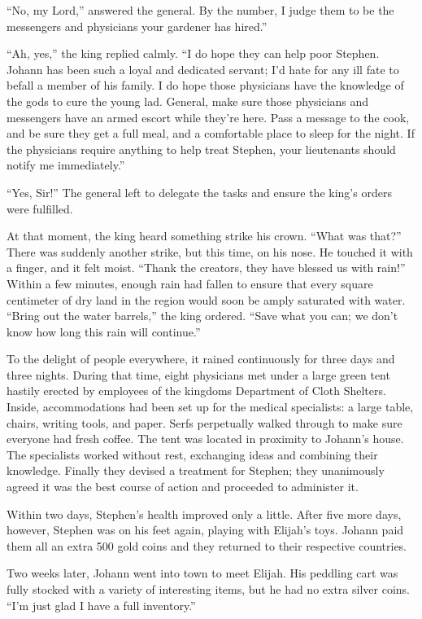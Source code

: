 “No, my Lord,” answered the general. By the number, I judge them to be the messengers and physicians your gardener has hired.”

“Ah, yes,” the king replied calmly. “I do hope they can help poor Stephen. Johann has been such a loyal and dedicated servant; I'd hate for any ill fate to befall a member of his family. I do hope those physicians have the knowledge of the gods to cure the young lad. General, make sure those physicians and messengers have an armed escort while they're here. Pass a message to the cook, and be sure they get a full meal, and a comfortable place to sleep for the night. If the physicians require anything to help treat Stephen, your lieutenants should notify me immediately.”

“Yes, Sir!” The general left to delegate the tasks and ensure the king's orders were fulfilled.

At that moment, the king heard something strike his crown. “What was that?” There was suddenly another strike, but this time, on his nose. He touched it with a finger, and it felt moist. “Thank the creators, they have blessed us with rain!” Within a few minutes, enough rain had fallen to ensure that every square centimeter of dry land in the region would soon be amply saturated with water. “Bring out the water barrels,” the king ordered. “Save what you can; we don't know how long this rain will continue.”

To the delight of people everywhere, it rained continuously for three days and three nights. During that time, eight physicians met under a large green tent hastily erected by employees of the kingdoms Department of Cloth Shelters. Inside, accommodations had been set up for the medical specialists: a large table, chairs, writing tools, and paper. Serfs perpetually walked through to make sure everyone had fresh coffee. The tent was located in proximity to Johann's house. The specialists worked without rest, exchanging ideas and combining their knowledge. Finally they devised a treatment for Stephen; they unanimously agreed it was the best course of action and proceeded to administer it.

Within two days, Stephen's health improved only a little. After five more days, however, Stephen was on his feet again, playing with Elijah's toys. Johann paid them all an extra 500 gold coins and they returned to their respective countries.

Two weeks later, Johann went into town to meet Elijah. His peddling cart was fully stocked with a variety of interesting items, but he had no extra silver coins. “I'm just glad I have a full inventory.”

